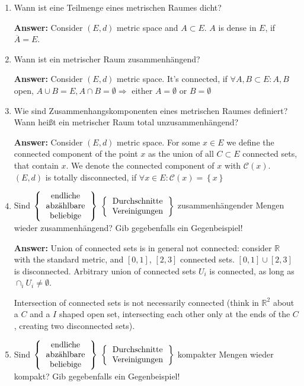 \documentclass[11pt]{article}
\newcommand{\RR}[0]{\mathbb{R}}
\begin{document}
\begin{enumerate}
    \item Wann ist eine Teilmenge eines metrischen Raumes dicht?

    \textbf{Answer:} Consider $(E, d)$ metric space and $A \subset E$. $A$ is dense in $E$, if $\overline{A} = E$.

    \item Wann ist ein metrischer Raum zusammenhängend?

    \textbf{Answer:} Consider $(E, d)$ metric space. It's connected, if $\forall A, B \subset E\colon A, B$ open, $A \cup B = E, A \cap B = \emptyset \Rightarrow$ either $A = \emptyset$ or $B = \emptyset$
    \item Wie sind Zusammenhangskomponenten eines metrischen Raumes definiert? Wann heißt ein metrischer Raum total unzusammenhängend?

    \textbf{Answer:} Consider $(E, d)$ metric space. For some $x\in E$ we define the connected component of the point $x$ as the union of all $C\subset E$ connected sets, that contain $x$. We denote the connected component of $x$ with $\mathcal{C}(x)$. $(E, d)$ is totally disconnected, if $\forall x\in E\colon \mathcal{C}(x) = \left\{x\right\}$

    \item Sind $\left\{\begin{tabular}{c}
    \text{endliche}\\
    \text{abzählbare}\\
    \text{beliebige}
    \end{tabular}\right\}$ $\left\{\begin{tabular}{c}
    \text{Durchschnitte}\\
    \text{Vereinigungen}
    \end{tabular}\right\}$ zusammenhängender Mengen wieder zusammenhängend? Gib gegebenfalls ein Gegenbeispiel!

    \textbf{Answer:} Union of connected sets is in general not connected: consider $\RR$ with the standard metric, and $[0, 1]$, $[2, 3]$ connected sets. $[0, 1] \cup [2, 3]$ is disconnected. Arbitrary union of connected sets $U_i$ is connected, as long as $\cap_i U_i \neq \emptyset$.

    Intersection of connected sets is not necessarily connected (think in $\RR^2$ about a $C$ and a $I$ shaped open set, intersecting each other only at the ends of the $C$, creating two disconnected sets).

    \item Sind $\left\{\begin{tabular}{c}
        \text{endliche}\\
        \text{abzählbare}\\
        \text{beliebige}
    \end{tabular}\right\}$ $\left\{\begin{tabular}{c}
        \text{Durchschnitte}\\
        \text{Vereinigungen}
    \end{tabular}\right\}$ kompakter Mengen wieder kompakt? Gib gegebenfalls ein Gegenbeispiel!


\end{enumerate}
\end{document}
